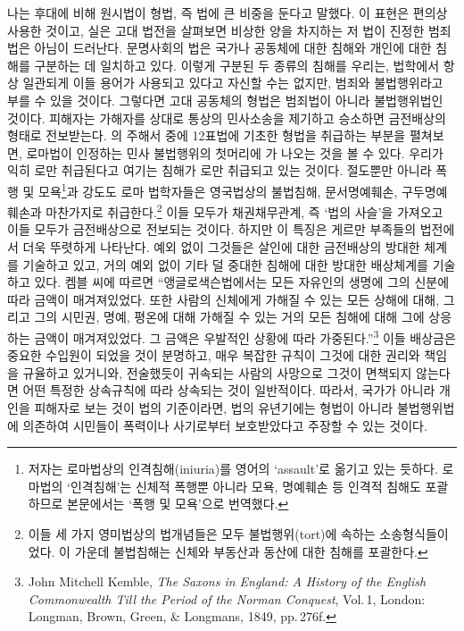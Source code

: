 나는 후대에 비해 원시법이 형법,
즉 법에
큰 비중을 둔다고 말했다.
이 표현은 편의상 사용한 것이고,
실은
고대 법전을 살펴보면
비상한 양을 차지하는 저 법이
진정한 범죄법은 아님이 드러난다.
문명사회의 법은
국가나 공동체에 대한 침해와
개인에 대한 침해를 구분하는 데 일치하고 있다.
이렇게 구분된 두 종류의 침해를 우리는,
법학에서 항상 일관되게 이들 용어가 사용되고 있다고 자신할 수는 없지만,
범죄와
불법행위라고
부를 수 있을 것이다.
그렇다면 고대 공동체의 형법은
범죄법이 아니라
불법행위법인 것이다.
피해자는 가해자를 상대로 통상의 민사소송을 제기하고
승소하면 금전배상의 형태로 전보받는다.
의 주해서 중에
12표법에 기초한 형법을 취급하는 부분을 펼쳐보면,
로마법이 인정하는 민사 불법행위의 첫머리에
가 나오는 것을 볼 수 있다.
우리가 익히 로만 취급된다고 여기는 침해가
로만 취급되고 있는 것이다.
절도뿐만 아니라
폭행 및 모욕\footnote{%
  저자는 로마법상의 인격침해(iniuria)를 영어의 `assault'로 옮기고 있는 듯하다.
  로마법의 `인격침해'는 신체적 폭행뿐 아니라
  모욕, 명예훼손 등 인격적 침해도
  포괄하므로 본문에서는 `폭행 및 모욕'으로 번역했다.
}과 강도도
로마 법학자들은 영국법상의 불법침해,
문서명예훼손, 구두명예훼손과
마찬가지로 취급한다.\footnote{%
  이들 세 가지 영미법상의 법개념들은 모두
  불법행위(tort)에 속하는 소송형식들이었다.
  이 가운데 불법침해는 신체와 부동산과 동산에 대한 침해를 포괄한다. }
이들 모두가 채권채무관계, 즉 `법의 사슬'을
가져오고 이들 모두가 금전배상으로 전보되는 것이다.
하지만 이 특징은 게르만 부족들의 법전에서 더욱 뚜렷하게 나타난다.
예외 없이 그것들은
살인에 대한 금전배상의 방대한 체계를 기술하고 있고,
거의 예외 없이
기타 덜 중대한 침해에 대한 방대한 배상체계를 기술하고 있다.
켐블 씨에 따르면
``앵글로색슨법에서는 
모든 자유인의 생명에 그의 신분에 따라 금액이 매겨져있었다.
또한 사람의 신체에게 가해질 수 있는 모든 상해에 대해,
그리고 그의 시민권, 명예, 평온에 대해 가해질 수 있는 거의 모든 침해에 대해
그에 상응하는 금액이 매겨져있었다.
그 금액은 우발적인 상황에 따라 가중된다.''\footnote{%
  \latinmarks
  John Mitchell Kemble,
  \textit{The Saxons in England: A History of the English Commonwealth
  Till the Period of the Norman Conquest},
  Vol.\,1,
  London: Longman, Brown, Green, \& Longmans, 1849,
  pp.\,276f.}
이들 배상금은 중요한 수입원이 되었을 것이 분명하고,
매우 복잡한 규칙이 그것에 대한 권리와 책임을 규율하고 있거니와,
전술했듯이 귀속되는 사람의 사망으로 그것이 면책되지 않는다면
어떤 특정한 상속규칙에 따라 상속되는 것이 일반적이다.
따라서,
국가가 아니라 개인을 피해자로 보는 것이
법의 기준이라면,
법의 유년기에는
형법이 아니라
불법행위법에 의존하여
시민들이
폭력이나 사기로부터 보호받았다고 주장할 수 있는 것이다.

